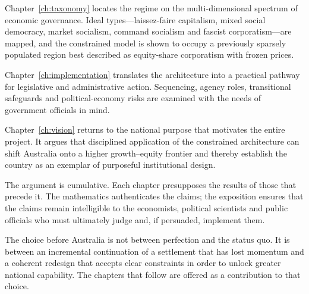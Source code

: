 \documentclass[12pt,anyside]{book}
\theoremstyle{definition}
\theoremstyle{plain}
\theoremstyle{remark}
\begin{document}
Chapter~\ref{ch:taxonomy} locates the regime on the multi-dimensional spectrum of economic governance. Ideal types—laissez-faire capitalism, mixed social democracy, market socialism, command socialism and fascist corporatism—are mapped, and the constrained model is shown to occupy a previously sparsely populated region best described as equity-share corporatism with frozen prices.

Chapter~\ref{ch:implementation} translates the architecture into a practical pathway for legislative and administrative action. Sequencing, agency roles, transitional safeguards and political-economy risks are examined with the needs of government officials in mind.

Chapter~\ref{ch:vision} returns to the national purpose that motivates the entire project. It argues that disciplined application of the constrained architecture can shift Australia onto a higher growth–equity frontier and thereby establish the country as an exemplar of purposeful institutional design.

The argument is cumulative. Each chapter presupposes the results of those that precede it. The mathematics authenticates the claims; the exposition ensures that the claims remain intelligible to the economists, political scientists and public officials who must ultimately judge and, if persuaded, implement them.

The choice before Australia is not between perfection and the status quo. It is between an incremental continuation of a settlement that has lost momentum and a coherent redesign that accepts clear constraints in order to unlock greater national capability. The chapters that follow are offered as a contribution to that choice.

\end{document}
